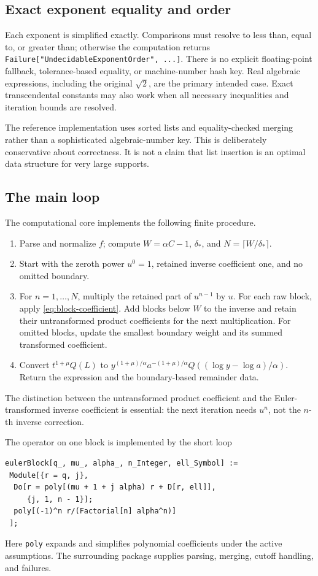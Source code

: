 \documentclass[11pt,a4paper]{article}
\numberwithin{equation}{section}
\theoremstyle{definition}\newtheorem{definition}[theorem]{Definition}
\theoremstyle{remark}\newtheorem{remark}[theorem]{Remark}
\DeclareRobustCommand{\code}[1]{{\small\ttfamily\urlstyle{same}\nolinkurl{#1}}}
\begin{document}
\subsection{Exact exponent equality and order}
Each exponent is simplified exactly. Comparisons must resolve to less than,
equal to, or greater than; otherwise the computation returns
\code{Failure["UndecidableExponentOrder", ...]}. There is no explicit
floating-point fallback, tolerance-based equality, or machine-number hash
key. Real algebraic expressions, including the original \(\sqrt2\), are the
primary intended case. Exact transcendental constants may also work when
all necessary inequalities and iteration bounds are resolved.

The reference implementation uses sorted lists and equality-checked merging
rather than a sophisticated algebraic-number key. This is deliberately
conservative about correctness. It is not a claim that list insertion is an
optimal data structure for very large supports.

\subsection{The main loop}
The computational core implements the following finite procedure.
\begin{enumerate}
\item Parse and normalize \(f\); compute \(W=\alpha C-1\), \(\delta_*\),
and \(N=\lceil W/\delta_*\rceil\).
\item Start with the zeroth power \(u^0=1\), retained inverse coefficient
one, and no omitted boundary.
\item For \(n=1,\ldots,N\), multiply the retained part of \(u^{n-1}\) by
\(u\). For each raw block, apply \eqref{eq:block-coefficient}. Add blocks
below \(W\) to the inverse and retain their untransformed product
coefficients for the next multiplication. For omitted blocks, update the
smallest boundary weight and its summed transformed coefficient.
\item Convert \(t^{1+\mu}Q(L)\) to
\(y^{(1+\mu)/\alpha}a^{-(1+\mu)/\alpha}
 Q((\log y-\log a)/\alpha)\). Return the expression and the boundary-based
remainder data.
\end{enumerate}
The distinction between the untransformed product coefficient and the
Euler-transformed inverse coefficient is essential: the next iteration
needs \(u^n\), not the \(n\)-th inverse correction.

The operator on one block is implemented by the short loop
\begin{lstlisting}
eulerBlock[q_, mu_, alpha_, n_Integer, ell_Symbol] :=
 Module[{r = q, j},
  Do[r = poly[(mu + 1 + j alpha) r + D[r, ell]],
     {j, 1, n - 1}];
  poly[(-1)^n r/(Factorial[n] alpha^n)]
 ];
\end{lstlisting}
Here \code{poly} expands and simplifies polynomial coefficients under the
active assumptions. The surrounding package supplies parsing, merging,
cutoff handling, and failures.
\end{document}
